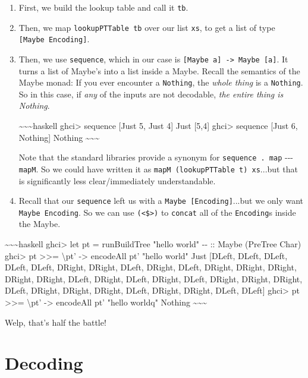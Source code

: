 \documentclass[]{article}
\begin{document}
\begin{enumerate}
\item
  First, we build the lookup table and call it \texttt{tb}.
\item
  Then, we map \texttt{lookupPTTable\ tb} over our list \texttt{xs}, to get a
  list of type \texttt{{[}Maybe\ Encoding{]}}.
\item
  Then, we use \texttt{sequence}, which in our case is
  \texttt{{[}Maybe\ a{]}\ -\textgreater{}\ Maybe\ {[}a{]}}. It turns a list of
  Maybe's into a list inside a Maybe. Recall the semantics of the Maybe monad:
  If you ever encounter a \texttt{Nothing}, the \emph{whole thing} is a
  \texttt{Nothing}. So in this case, if \emph{any} of the inputs are not
  decodable, \emph{the entire thing is Nothing}.

  \textasciitilde{}\textasciitilde{}\textasciitilde{}haskell ghci\textgreater{}
  sequence {[}Just 5, Just 4{]} Just {[}5,4{]} ghci\textgreater{} sequence
  {[}Just 6, Nothing{]} Nothing
  \textasciitilde{}\textasciitilde{}\textasciitilde{}

  Note that the standard libraries provide a synonym for
  \texttt{sequence\ .\ map} -\/-\/- \texttt{mapM}. So we could have written it
  as \texttt{mapM\ (lookupPTTable\ t)\ xs}...but that is significantly less
  clear/immediately understandable.
\item
  Recall that our \texttt{sequence} left us with a
  \texttt{Maybe\ {[}Encoding{]}}...but we only want \texttt{Maybe\ Encoding}. So
  we can use \texttt{(\textless{}\$\textgreater{})} to \texttt{concat} all of
  the \texttt{Encoding}s inside the Maybe.
\end{enumerate}

\textasciitilde{}\textasciitilde{}\textasciitilde{}haskell ghci\textgreater{}
let pt = runBuildTree "hello world" -\/- :: Maybe (PreTree Char)
ghci\textgreater{} pt \textgreater{}\textgreater{}= \textbackslash{}pt'
-\textgreater{} encodeAll pt' "hello world" Just {[}DLeft, DLeft, DLeft, DLeft,
DLeft, DRight, DRight, DLeft, DRight, DLeft, DRight, DRight, DRight, DRight,
DRight, DLeft, DRight, DLeft, DRight, DLeft, DRight, DRight, DRight, DLeft,
DRight, DRight, DRight, DLeft, DRight, DRight, DLeft, DLeft{]}
ghci\textgreater{} pt \textgreater{}\textgreater{}= \textbackslash{}pt'
-\textgreater{} encodeAll pt' "hello worldq" Nothing
\textasciitilde{}\textasciitilde{}\textasciitilde{}

Welp, that's half the battle!

\section{Decoding}
\end{document}
